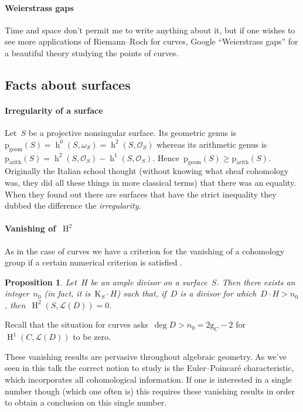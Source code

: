 \documentclass[10pt,a4paper]{article}
\theoremstyle{lecture}
\newtheorem{proposition}[theorem]{Proposition}
\DeclareMathOperator\hh{h}
\DeclareMathOperator\HH{H}
\begin{document}
\paragraph{Weierstrass gaps}
Time and space don't permit me to write anything about it, but if one wishes to see more applications of Riemann--Roch for curves, Google ``Weierstrass gaps'' for a beautiful theory studying the points of curves.

\subsection{Facts about surfaces}
\label{subsection:facts-surfaces}
\paragraph{Irregularity of a surface}
Let~$S$ be a projective nonsingular surface. Its geometric genus is~$\mathrm{p}_{\mathrm{geom}}(S)=\hh^0(S,\omega_S)=\hh^2(S,\mathcal{O}_S)$ whereas its arithmetic genus is~$\mathrm{p}_{\mathrm{arith}}(S)=\hh^2(S,\mathcal{O}_S)-\hh^1(S,\mathcal{O}_S)$. Hence~$\mathrm{p}_{\mathrm{geom}}(S)\geq\mathrm{p}_{\mathrm{arith}}(S)$. Originally the Italian school thought (without knowing what sheaf cohomology was, they did all these things in more classical terms) that there was an equality. When they found out there are surfaces that have the strict inequality they dubbed the difference the \emph{irregularity}.

\paragraph{Vanishing of~$\HH^2$}
As in the case of curves we have a criterion for the vanishing of a cohomology group if a certain numerical criterion is satisfied \cite[lemma V.1.7]{hartshorne-algebraic-geometry}.
\begin{proposition}
  Let~$H$ be an ample divisor on a surface~$S$. Then there exists an integer~$n_0$ (in fact, it is~$\mathrm{K}_S\cdot H$) such that, if~$D$ is a divisor for which~$D\cdot H>n_0$, then~$\HH^2(S,\mathcal{L}(D))=0$.
\end{proposition}
Recall that the situation for curves asks~$\deg D>n_0=2\mathrm{g}_C-2$ for~$\HH^1(C,\mathcal{L}(D))$ to be zero.

These vanishing results are pervasive throughout algebraic geometry. As we've seen in this talk the correct notion to study is the Euler--Poincar\'e characteristic, which incorporates all cohomological information. If one is interested in a single number though (which one often is) this requires these vanishing results in order to obtain a conclusion on this single number.

\printbibliography
\end{document}
